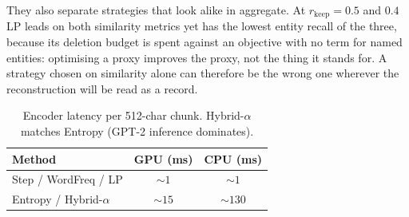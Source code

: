 \documentclass[11pt]{article}
\newcommand{\rkeep}{r_{\mathrm{keep}}}
\begin{document}
They also separate strategies that look alike in aggregate. At $\rkeep = 0.5$ and $0.4$ LP leads on both similarity
metrics yet has the lowest entity recall of the three, because its deletion budget is spent against an
objective with no term for named entities: optimising a proxy improves the proxy, not the thing it stands
for. A strategy chosen on similarity alone can therefore be the wrong one wherever the reconstruction will be
read as a record. 

\begin{table}[b]
\centering
\small
\setlength{\tabcolsep}{4pt}
\caption{Encoder latency per 512-char chunk. Hybrid-$\alpha$ matches Entropy (GPT-2 inference dominates).}
\label{tab:latency}
\begin{tabular}{lcc}
\toprule
\textbf{Method} & \textbf{GPU (ms)} & \textbf{CPU (ms)} \\
\midrule
Step / WordFreq / LP & ${\sim}1$ & ${\sim}1$ \\
Entropy / Hybrid-$\alpha$ & ${\sim}15$ & ${\sim}130$ \\
\bottomrule
\end{tabular}
\end{table}
\end{document}

